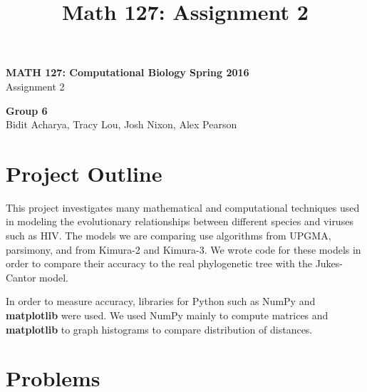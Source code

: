 \documentclass[11pt]{article}
\title{Math 127: Assignment 2}
\theoremstyle{definition}\newtheorem*{problem}{Problem}
\theoremstyle{remark}\newtheorem{claim}{Claim}
\theoremstyle{remark}\newtheorem*{sol}{Solution}
\begin{document}
\begin{center} {\Large \bf MATH 127: Computational Biology Spring 2016 } \\
                [8pt]{Assignment 2\\ [8pt]}\end{center}
                
                \begin{center} \textbf{Group 6}\\ Bidit Acharya, Tracy Lou, Josh Nixon, Alex Pearson
                \end{center}
                
\section{Project Outline}

This project investigates many mathematical and computational techniques used in modeling the evolutionary relationships between different species and viruses such as HIV. The models we are comparing use algorithms from UPGMA, parsimony, and from Kimura-2 and Kimura-3. We wrote code for these models in order to compare their accuracy to the real phylogenetic tree with the Jukes- Cantor model.

In order to measure accuracy, libraries for Python such as NumPy and \textbf{matplotlib} were used. We used NumPy mainly to compute matrices and \textbf{matplotlib} to graph histograms to compare distribution of distances.

\section{Problems}
\end{document}

